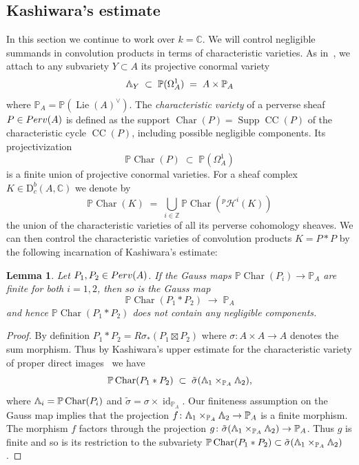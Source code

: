 \documentclass[a4paper]{amsart}
\newcommand{\bbC}{\mathbb{C}}
\newcommand{\bbP}{\mathbb{P}}
\newcommand{\bbV}{\mathbb{V}}
\newcommand{\bbZ}{\mathbb{Z}}
\newcommand{\cH}{\mathcal{H}}
\newcommand{\Dbc}{{\mathrm{D}^b_c}}
\newcommand{\Perv}{\textup{Perv}}
\newcommand{\PLambda}{\scalerel*{{\rotatebox[origin=c]{180}{$\bbV$}}}{\bbV}}
\DeclareMathOperator{\Supp}{Supp}
\DeclareMathOperator{\Lie}{Lie}
\DeclareMathOperator{\id}{id}
\DeclareMathOperator{\CC}{CC}
\DeclareMathOperator{\Char}{Char}
\newcommand{\PChar}{\bbP\Char}
\theoremstyle{plain}
\newtheorem{lemma}[theorem]{Lemma}
\theoremstyle{definition}
\numberwithin{equation}{section}
\begin{document}
\subsection{Kashiwara's estimate} In this section we continue to work over $k=\bbC$. We will control negligible summands in convolution products in terms of characteristic varieties. 
As in~\cite[def.~2.2]{JKLM}, we attach to any subvariety $Y\subset A$ its projective conormal variety
%
\[
 \PLambda_Y \;\subset\; \bbP(\Omega^1_A) \;=\; A \times \bbP_A
\]
%
where $\bbP_A = \bbP(\Lie(A)^\vee)$.
The \emph{characteristic variety} of a perverse sheaf $P\in \Perv(A)$ is defined as the support $\Char(P)=\Supp \CC(P)$ of the characteristic cycle $\CC(P)$, including possible negligible components. Its projectivization 
%
\[
 \PChar(P) \;\subset\; \bbP(\Omega^1_A)
\]
%
is a finite union of projective conormal varieties. For a sheaf complex $K\in \Dbc(A, \bbC)$ we denote by
%
\[
 \PChar(K) \;=\; \bigcup_{i\in \bbZ} \PChar(^p\cH^i(K))
\]
%
the union of the characteristic varieties of all its perverse cohomology sheaves. We can then control the characteristic varieties of convolution products $K=P*P$ by the following incarnation of Kashiwara's estimate:

\begin{lemma} \label{lem:Kashiwara-estimate}
Let $P_1, P_2\in \Perv(A)$. If the Gauss maps $\PChar(P_i)\to \bbP_A$ are finite for both $i=1,2$, then so is the Gauss map 
%
\[ 
 \PChar(P_1*P_2) \;\longrightarrow\; \bbP_A
\]
%
and hence $\PChar(P_1*P_2)$ does not contain any negligible components.
\end{lemma} 

\begin{proof} 
By definition $P_1*P_2 = R\sigma_*(P_1\boxtimes P_2)$ where $\sigma\colon A\times A \to A$ denotes the sum morphism. Thus by Kashiwara's upper estimate for the characteristic variety of proper direct images~\cite[th.~4.2(b)]{KashiwaraBFunctionsAndHolonomic} we have
%
\[
 \PChar(P_1*P_2) 
 \;\subset\; \tilde{\sigma}(\PLambda_1\times_{\bbP_A} \PLambda_2),
\]
%
where $\PLambda_i = \PChar(P_i)$ and $\tilde{\sigma} = \sigma \times \id_{\bbP_A}$. Our finiteness assumption on the Gauss map implies that the projection $f \colon \PLambda_1\times_{\bbP_A} \PLambda_2 \to \bbP_A$ is a finite morphism. The morphism $f$ factors through the projection $g \colon \tilde{\sigma}(\PLambda_1 \times_{\bbP_A} \PLambda_2) \to \bbP_A$. Thus $g$ is finite and so is its restriction to the subvariety $\PChar(P_1*P_2)\subset \tilde{\sigma}(\PLambda_1\times_{\bbP_A} \PLambda_2)$. 
\end{proof} 
\end{document}
